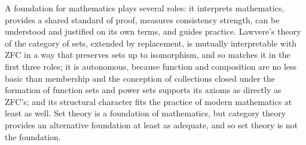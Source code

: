 \documentclass{situationist-preprint}
\begin{document}
A foundation for mathematics plays several roles: it interprets mathematics, provides a shared standard of proof, measures consistency strength, can be understood and justified on its own terms, and guides practice. Lawvere's theory of the category of sets, extended by replacement, is mutually interpretable with ZFC in a way that preserves sets up to isomorphism, and so matches it in the first three roles; it is autonomous, because function and composition are no less basic than membership and the conception of collections closed under the formation of function sets and power sets supports its axioms as directly as ZFC's; and its structural character fits the practice of modern mathematics at least as well. Set theory is a foundation of mathematics, but category theory provides an alternative foundation at least as adequate, and so set theory is not the foundation.
\end{document}
